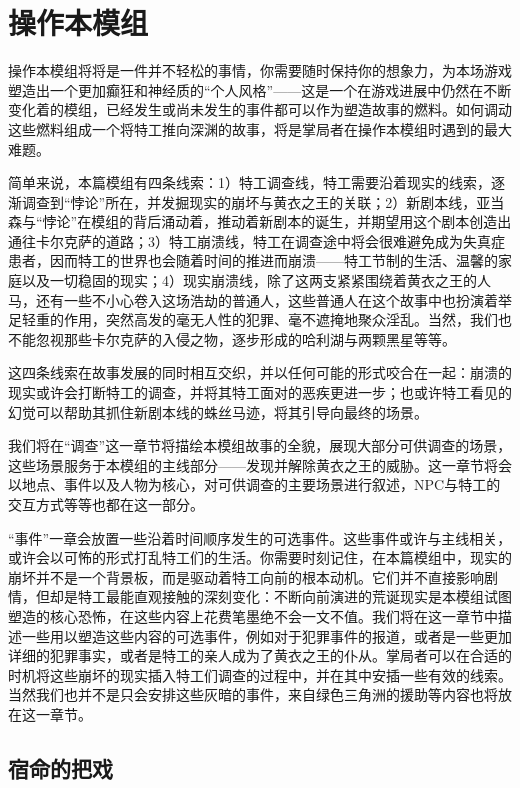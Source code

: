 \section{操作本模组}

操作本模组将将是一件并不轻松的事情，你需要随时保持你的想象力，为本场游戏塑造出一个更加癫狂和神经质的“个人风格”——这是一个在游戏进展中仍然在不断变化着的模组，已经发生或尚未发生的事件都可以作为塑造故事的燃料。如何调动这些燃料组成一个将特工推向深渊的故事，将是掌局者在操作本模组时遇到的最大难题。

简单来说，本篇模组有四条线索：1）特工调查线，特工需要沿着现实的线索，逐渐调查到“悖论”所在，并发掘现实的崩坏与黄衣之王的关联；2）新剧本线，亚当森与“悖论”在模组的背后涌动着，推动着新剧本的诞生，并期望用这个剧本创造出通往卡尔克萨的道路；3）特工崩溃线，特工在调查途中将会很难避免成为失真症患者，因而特工的世界也会随着时间的推进而崩溃——特工节制的生活、温馨的家庭以及一切稳固的现实；4）现实崩溃线，除了这两支紧紧围绕着黄衣之王的人马，还有一些不小心卷入这场浩劫的普通人，这些普通人在这个故事中也扮演着举足轻重的作用，突然高发的毫无人性的犯罪、毫不遮掩地聚众淫乱。当然，我们也不能忽视那些卡尔克萨的入侵之物，逐步形成的哈利湖与两颗黑星等等。

这四条线索在故事发展的同时相互交织，并以任何可能的形式咬合在一起：崩溃的现实或许会打断特工的调查，并将其特工面对的恶疾更进一步；也或许特工看见的幻觉可以帮助其抓住新剧本线的蛛丝马迹，将其引导向最终的场景。

我们将在“调查”这一章节将描绘本模组故事的全貌，展现大部分可供调查的场景，这些场景服务于本模组的主线部分——发现并解除黄衣之王的威胁。这一章节将会以地点、事件以及人物为核心，对可供调查的主要场景进行叙述，NPC与特工的交互方式等等也都在这一部分。

“事件”一章会放置一些沿着时间顺序发生的可选事件。这些事件或许与主线相关，或许会以可怖的形式打乱特工们的生活。你需要时刻记住，在本篇模组中，现实的崩坏并不是一个背景板，而是驱动着特工向前的根本动机。它们并不直接影响剧情，但却是特工最能直观接触的深刻变化：不断向前演进的荒诞现实是本模组试图塑造的核心恐怖，在这些内容上花费笔墨绝不会一文不值。我们将在这一章节中描述一些用以塑造这些内容的可选事件，例如对于犯罪事件的报道，或者是一些更加详细的犯罪事实，或者是特工的亲人成为了黄衣之王的仆从。掌局者可以在合适的时机将这些崩坏的现实插入特工们调查的过程中，并在其中安插一些有效的线索。当然我们也并不是只会安排这些灰暗的事件，来自绿色三角洲的援助等内容也将放在这一章节。

\subsection{宿命的把戏}

